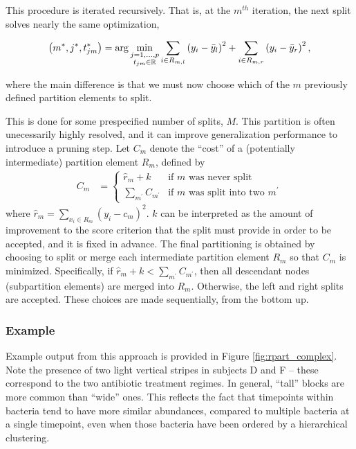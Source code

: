 This procedure is iterated recursively. That is, at the $m^{th}$ iteration, the
next split solves nearly the same optimization,

\begin{align*}
  \left(m^{\ast}, j^{\ast}, t_{jm}^{\ast}\right) = \arg \min_{\substack{j = 1, \dots, p \\ t_{jm} \in \mathbb{R}}}
  \sum_{i \in R_{m, l}} \left(y_{i} - \bar{y}_{l}\right)^{2} +
  \sum_{i \in R_{m, r}} \left(y_{i} - \bar{y}_{r}\right)^{2},
\end{align*}

where the main difference is that we must now choose which of the $m$ previously
defined partition elements to split.

This is done for some prespecified number of splits, $M$. This partition is
often unecessarily highly resolved, and it can improve generalization
performance to introduce a pruning step. Let $C_{m}$ denote the ``cost'' of a
(potentially intermediate) partition element $R_{m}$, defined by
\begin{align*}
  C_{m} &= \begin{cases}
    \hat{r}_{m} + k & \text{if $m$ was never split} \\
    \sum_{m^\prime} C_{m^{\prime}} & \text{if $m$ was split into two $m^{\prime}$}
    \end{cases}
\end{align*}
where $\hat{r}_{m} = \sum_{x_{i} \in R_{m}} \left(y_{i} - c_{m}\right)^{2}$. $k$
can be interpreted as the amount of improvement to the score criterion that the
split must provide in order to be accepted, and it is fixed in advance. The
final partitioning is obtained by choosing to split or merge each intermediate
partition element $R_m$ so that $C_{m}$ is minimized. Specifically, if
$\hat{r}_{m} + k < \sum_{m^{\prime}} C_{m^{\prime}}$, then all descendant nodes
(subpartition elements) are merged into $R_{m}$. Otherwise, the left and right
splits are accepted. These choices are made sequentially, from the bottom up.

\subsubsection{Example}
\label{subsubcart_example}

Example output from this approach is provided in Figure \ref{fig:rpart_complex}.
Note the presence of two light vertical stripes in subjects D and F -- these
correspond to the two antibiotic treatment regimes. In general, ``tall'' blocks
are more common than ``wide'' ones. This reflects the fact that timepoints
within bacteria tend to have more similar abundances, compared to multiple
bacteria at a single timepoint, even when those bacteria have been ordered by a
hierarchical clustering.

